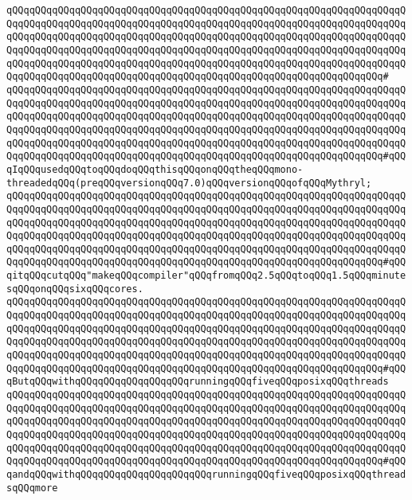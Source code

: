 \verb|qQQqqQQqqQQqqQQqqQQqqQQqqQQqqQQqqQQqqQQqqQQqqQQqqQQqqQQqqQQqqQQqqQQqqQQqqQQqqQQqqQQqqQQqqQQqqQQqqQQqqQQqqQQqqQQqqQQqqQQqqQQqqQQqqQQqqQQqqQQqqQQqqQQqqQQqqQQqqQQqqQQqqQQqqQQqqQQqqQQqqQQqqQQqqQQqqQQqqQQqqQQqqQQqqQQqqQQqqQQqqQQqqQQqqQQqqQQqqQQqqQQqqQQqqQQqqQQqqQQqqQQqqQQqqQQqqQQqqQQqqQQqqQQqqQQqqQQqqQQqqQQqqQQqqQQqqQQqqQQqqQQqqQQqqQQqqQQqqQQqqQQqqQQqqQQqqQQqqQQqqQQqqQQqqQQqqQQqqQQqqQQqqQQqqQQqqQQqqQQqqQQqqQQqqQQqqQQq#|\newline
\verb|qQQqqQQqqQQqqQQqqQQqqQQqqQQqqQQqqQQqqQQqqQQqqQQqqQQqqQQqqQQqqQQqqQQqqQQqqQQqqQQqqQQqqQQqqQQqqQQqqQQqqQQqqQQqqQQqqQQqqQQqqQQqqQQqqQQqqQQqqQQqqQQqqQQqqQQqqQQqqQQqqQQqqQQqqQQqqQQqqQQqqQQqqQQqqQQqqQQqqQQqqQQqqQQqqQQqqQQqqQQqqQQqqQQqqQQqqQQqqQQqqQQqqQQqqQQqqQQqqQQqqQQqqQQqqQQqqQQqqQQqqQQqqQQqqQQqqQQqqQQqqQQqqQQqqQQqqQQqqQQqqQQqqQQqqQQqqQQqqQQqqQQqqQQqqQQqqQQqqQQqqQQqqQQqqQQqqQQqqQQqqQQqqQQqqQQqqQQqqQQqqQQqqQQqqQQqqQQq#qQQqIqQQqusedqQQqtoqQQqdoqQQqthisqQQqonqQQqtheqQQqmono-threadedqQQq(preqQQqversionqQQq7.0)qQQqversionqQQqofqQQqMythryl;|\newline
\verb|qQQqqQQqqQQqqQQqqQQqqQQqqQQqqQQqqQQqqQQqqQQqqQQqqQQqqQQqqQQqqQQqqQQqqQQqqQQqqQQqqQQqqQQqqQQqqQQqqQQqqQQqqQQqqQQqqQQqqQQqqQQqqQQqqQQqqQQqqQQqqQQqqQQqqQQqqQQqqQQqqQQqqQQqqQQqqQQqqQQqqQQqqQQqqQQqqQQqqQQqqQQqqQQqqQQqqQQqqQQqqQQqqQQqqQQqqQQqqQQqqQQqqQQqqQQqqQQqqQQqqQQqqQQqqQQqqQQqqQQqqQQqqQQqqQQqqQQqqQQqqQQqqQQqqQQqqQQqqQQqqQQqqQQqqQQqqQQqqQQqqQQqqQQqqQQqqQQqqQQqqQQqqQQqqQQqqQQqqQQqqQQqqQQqqQQqqQQqqQQqqQQqqQQqqQQqqQQq#qQQqitqQQqcutqQQq"makeqQQqcompiler"qQQqfromqQQq2.5qQQqtoqQQq1.5qQQqminutesqQQqonqQQqsixqQQqcores.|\newline
\verb|qQQqqQQqqQQqqQQqqQQqqQQqqQQqqQQqqQQqqQQqqQQqqQQqqQQqqQQqqQQqqQQqqQQqqQQqqQQqqQQqqQQqqQQqqQQqqQQqqQQqqQQqqQQqqQQqqQQqqQQqqQQqqQQqqQQqqQQqqQQqqQQqqQQqqQQqqQQqqQQqqQQqqQQqqQQqqQQqqQQqqQQqqQQqqQQqqQQqqQQqqQQqqQQqqQQqqQQqqQQqqQQqqQQqqQQqqQQqqQQqqQQqqQQqqQQqqQQqqQQqqQQqqQQqqQQqqQQqqQQqqQQqqQQqqQQqqQQqqQQqqQQqqQQqqQQqqQQqqQQqqQQqqQQqqQQqqQQqqQQqqQQqqQQqqQQqqQQqqQQqqQQqqQQqqQQqqQQqqQQqqQQqqQQqqQQqqQQqqQQqqQQqqQQqqQQqqQQq#qQQqButqQQqwithqQQqqQQqqQQq|\verb|qQQqqQQqrunningqQQqfiveqQQqposixqQQqthreads|\newline
\verb|qQQqqQQqqQQqqQQqqQQqqQQqqQQqqQQqqQQqqQQqqQQqqQQqqQQqqQQqqQQqqQQqqQQqqQQqqQQqqQQqqQQqqQQqqQQqqQQqqQQqqQQqqQQqqQQqqQQqqQQqqQQqqQQqqQQqqQQqqQQqqQQqqQQqqQQqqQQqqQQqqQQqqQQqqQQqqQQqqQQqqQQqqQQqqQQqqQQqqQQqqQQqqQQqqQQqqQQqqQQqqQQqqQQqqQQqqQQqqQQqqQQqqQQqqQQqqQQqqQQqqQQqqQQqqQQqqQQqqQQqqQQqqQQqqQQqqQQqqQQqqQQqqQQqqQQqqQQqqQQqqQQqqQQqqQQqqQQqqQQqqQQqqQQqqQQqqQQqqQQqqQQqqQQqqQQqqQQqqQQqqQQqqQQqqQQqqQQqqQQqqQQqqQQqqQQqqQQq#qQQqandqQQqwithqQQqqQQqqQQq|\verb|qQQqqQQqqQQqrunningqQQqfiveqQQqposixqQQqthreadsqQQqmore|\newline
